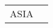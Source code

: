\documentclass[journal abbreviation, manuscript]{copernicus}
\begin{document}
\begin{table}
\begin{tabularx}{\textwidth}{lX}
     ASIA &                                                                                                                                                                                                                                                                                                                                                                                                                                                                                                                                                                                                                                                                                                                                                                                                                                                                                                                                                                                                                                                                                                                                                                                                                                                                                                                                                                                                                                                                                                                                                                                                                                                                                                                                                                                                                                                                                                                                                                                                                                                                                                                                                                                                                                                                                                                                                                                                                                                                                                                                                                                                                                                                                                                                                                                                                                                                                                                                                                                                                                                                                                                                                                                                                                                                                                                                                                                                              
\end{tabularx}
\end{table}
\end{document}
